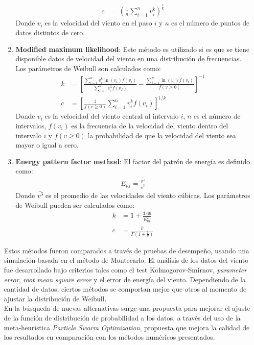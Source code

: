 \begin{enumerate}
\begin{align}
            c &= (\frac{1}{n}\sum_{i=1}^n v_i^k)^{\frac{1}{k}}
        \end{align}    
         Donde $v_i$ es la velocidad del viento en el paso $i$ y $n$ es el número de puntos de datos distintos de cero. 
    \item \textbf{Modified maximum likelihood}: Este método es utilizado si es que se tiene disponible datos de velocidad del viento en una distribución de frecuencias. Los parámetros de Weibull son calculados como:
        \begin{align}
            k &= [\frac{\sum_{i=1}^n v_i^k \ln(v_i)f(v_i)}{\sum_{i=1}^n v_i^kf(v_I)} - \frac{\sum_{i=1}^n\ln(v_i)f(v_i)}{f(v \geq 0)}]^{-1}\\
            c &= [\frac{1}{f(v \geq 0)}\sum_{i=1}^n v_i^{k}f(v_i)]^{1/k}
        \end{align}
         Donde $v_i$ es la velocidad del viento central al intervalo $i$, $n$ es el número de intervalos, $f(v_i)$ es la frecuencia de la velocidad del viento dentro del intervalo $i$ y $f(v \geq 0)$ la probabilidad de que la velocidad del viento sea mayor o igual a cero.
    \item \textbf{Energy pattern factor method}: El factor del patrón de energía es definido como:
        \begin{align}
            E_{pf} = \frac{\bar{v^3}}{\bar{v}^3}
        \end{align}   
         Donde $\bar{v^3}$ es el promedio de las velocidades del viento cúbicas. Los parámetros de Weibull pueden ser calculados como:
        \begin{align}
            k &= 1 + \frac{3.69}{E_{pf}^2}\\
            c &= \frac{\bar{v}}{\Gamma(1 + \frac{1}{k})}
        \end{align}    
 \end{enumerate}     
 Estos métodos fueron comparados a través de pruebas de desempeño, usando una simulación basada en el método de Montecarlo. El análisis de los datos del viento fue desarrollado bajo criterios tales como el test Kolmogorov-Smirnov, \emph{parameter error}, \emph{root mean square error} y el error de energía del viento. Dependiendo de la cantidad de datos, ciertos métodos se comportan mejor que otros al momento de ajustar la distribución de Weibull.\\
 En la búsqueda de nuevas alternativas surge una propuesta para mejorar el ajuste de la función de distribución de probabilidad a los datos, a través del uso de la meta-heurística \emph{Particle Swarm Optimization}, propuesta que mejora la calidad de los resultados en comparación con los métodos numéricos presentados.  
